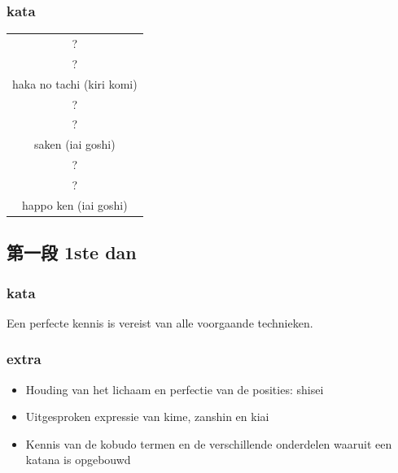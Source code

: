 \documentclass[a4paper, 12pt]{article}
\begin{document}
\begin{CJK*}{UTF8}{min}
\subsubsection{kata}
\begin{table}[H]
\begin{center}
\begin{tabular}{c}
?\\
?\\
haka no tachi (kiri komi)\\
\hline
?\\
?\\
saken (iai goshi)\\
\hline
?\\
?\\
happo ken (iai goshi)
\end{tabular}
\end{center}
\label{kyuu_1_katori_kata}
\end{table}

\subsection{第一段 1ste dan}
\subsubsection{kata}
\noindent Een perfecte kennis is vereist van alle voorgaande technieken.\\

\subsubsection{extra}
\begin{itemize}
\item Houding van het lichaam en perfectie van de posities: shisei
\item Uitgesproken expressie van kime, zanshin en kiai
\item Kennis van de kobudo termen en de verschillende onderdelen waaruit een katana is opgebouwd
\end{itemize}

\end{CJK*}
\end{document}
